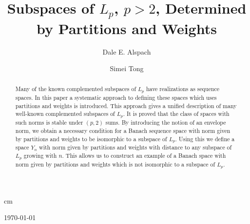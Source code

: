 \documentclass[12pt]{amsart}
\theoremstyle{definition}
\theoremstyle{remark}
\numberwithin{equation}{section}
\begin{document}
\title[Complemented Subspaces of $L_p$ Determined by Partitions and Weights]
   {Subspaces of $L_p$, $p>2$, Determined by Partitions and Weights}
 cm
\author {Dale E. Alspach}
\address{Department of Mathematics, Oklahoma State
   University, Stillwater, OK 74078}
\author {Simei Tong}
\address{Department of Mathematics, University of Wisconsin-Eau
   Claire, Eau Claire, WI 54701}


\today

\begin{abstract}Many of the
known complemented subspaces of $L_p$ have realizations
as sequence spaces. In this paper a systematic approach to defining
these spaces which uses partitions and weights is introduced. This approach
gives a
unified description of many well-known complemented subspaces of
$L_p$. It is proved that the class of spaces with such norms is stable under
$(p,2)$ sums.
 By introducing the notion of an envelope norm, we obtain a necessary condition 
for a Banach sequence space with norm given by partitions and weights
 to be isomorphic to a subspace of $L_p$. Using this we define  
 a space $Y_n$ with norm given by partitions and weights 
with distance to any subspace of $L_p$ growing with $n$. This allows
us to construct an example of a Banach space with norm
given by partitions and weights which is not isomorphic to
 a subspace of $L_p$.
\end{abstract}
\maketitle
 

\end{document}
